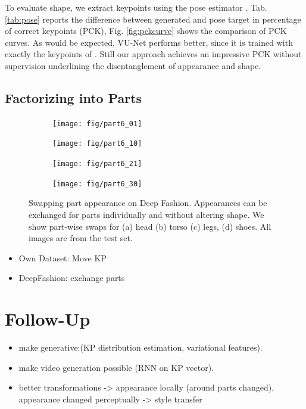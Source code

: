 	To evaluate shape, we extract keypoints using the pose estimator \cite{cao17affinityfield}. Tab. \ref{tab:pose} reports the difference between generated and pose target in percentage of correct keypoints (PCK), Fig. \ref{fig:pckcurve} shows the comparison of PCK curves. As would be expected, VU-Net performs better, since it is trained with exactly the keypoints of \cite{cao17affinityfield}. Still our approach achieves an impressive PCK without supervision underlining the disentanglement of appearance and shape.


	\subsection{Factorizing into Parts}
	\begin{figure}[ht]
		\begin{subfigure}{0.49\linewidth}
		\centering
		\texttt{[image: fig/part6\_01]}\caption{}
		\label{fig:part3_00}
		\end{subfigure}
		\begin{subfigure}{0.49\linewidth}
		\centering
		\texttt{[image: fig/part6\_10]}\caption{}
		\label{fig:part3_11}
		\end{subfigure}
		\begin{subfigure}{0.49\linewidth}
		\centering
		\texttt{[image: fig/part6\_21]}\caption{}
		\label{fig:part3_21}
		\end{subfigure}
		\begin{subfigure}{0.49\linewidth}
		\centering
		\texttt{[image: fig/part6\_30]}\caption{}
		\label{fig:part3_30}
		\end{subfigure}
		\caption{Swapping part appearance on Deep Fashion. Appearances can be exchanged for parts individually and without altering shape. We show part-wise swaps for (a) head (b) torso (c) legs, (d) shoes. All images are from the test set.}
		\label{fig:partswaps}
	\end{figure}
	\begin{itemize}
		\item Own Dataset: Move KP
		\item DeepFashion: exchange parts
	\end{itemize}

\section{Follow-Up}
	\begin{itemize}
		\item make generative:(KP distribution estimation, variational features).
		\item make video generation possible (RNN on KP vector).
		\item better transformations -> appearance locally (around parts changed), appearance changed perceptually -> style transfer
	\end{itemize}






